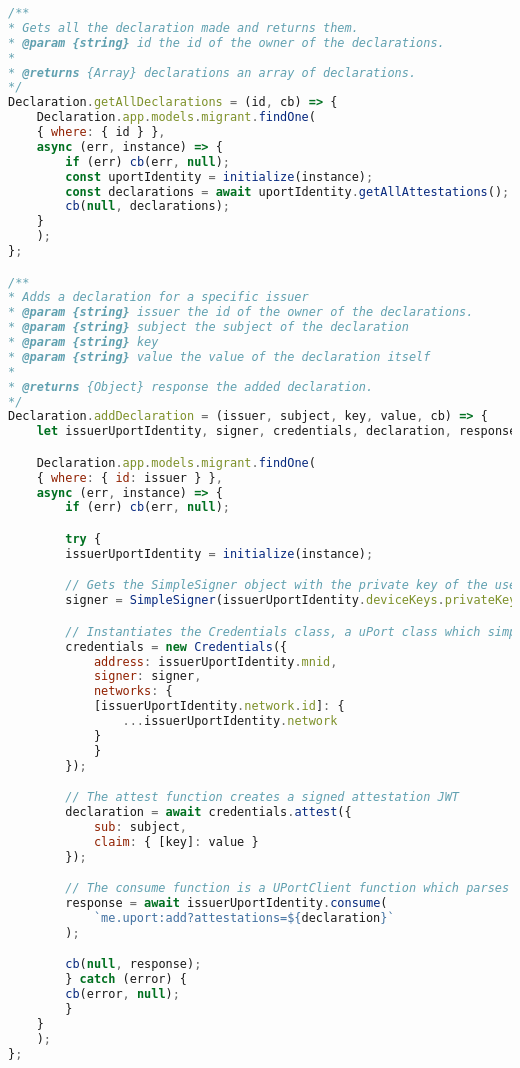 \begin{lstlisting}[language=JavaScript]
/**
* Gets all the declaration made and returns them.
* @param {string} id the id of the owner of the declarations.
*
* @returns {Array} declarations an array of declarations.
*/
Declaration.getAllDeclarations = (id, cb) => {
    Declaration.app.models.migrant.findOne(
    { where: { id } },
    async (err, instance) => {
        if (err) cb(err, null);
        const uportIdentity = initialize(instance);
        const declarations = await uportIdentity.getAllAttestations();
        cb(null, declarations);
    }
    );
};

/**
* Adds a declaration for a specific issuer
* @param {string} issuer the id of the owner of the declarations.
* @param {string} subject the subject of the declaration
* @param {string} key
* @param {string} value the value of the declaration itself
*
* @returns {Object} response the added declaration.
*/
Declaration.addDeclaration = (issuer, subject, key, value, cb) => {
    let issuerUportIdentity, signer, credentials, declaration, response;

    Declaration.app.models.migrant.findOne(
    { where: { id: issuer } },
    async (err, instance) => {
        if (err) cb(err, null);

        try {
        issuerUportIdentity = initialize(instance);

        // Gets the SimpleSigner object with the private key of the user, which is needed to sign transactions
        signer = SimpleSigner(issuerUportIdentity.deviceKeys.privateKey);

        // Instantiates the Credentials class, a uPort class which simplifies the creation of signed attestation JWTs
        credentials = new Credentials({
            address: issuerUportIdentity.mnid,
            signer: signer,
            networks: {
            [issuerUportIdentity.network.id]: {
                ...issuerUportIdentity.network
            }
            }
        });

        // The attest function creates a signed attestation JWT
        declaration = await credentials.attest({
            sub: subject,
            claim: { [key]: value }
        });

        // The consume function is a UPortClient function which parses uPort uris and relays them to the responsible functions
        response = await issuerUportIdentity.consume(
            `me.uport:add?attestations=${declaration}`
        );

        cb(null, response);
        } catch (error) {
        cb(error, null);
        }
    }
    );
};
\end{lstlisting}

